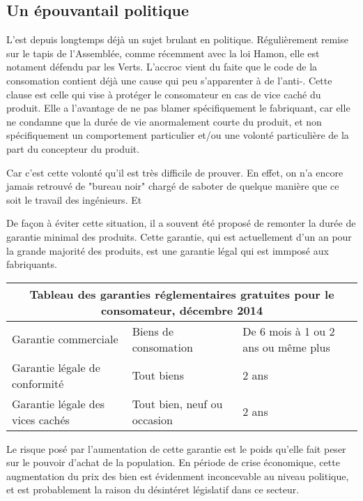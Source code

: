 \subsection{Un épouvantail politique}
L'\op est depuis longtemps déjà un sujet brulant en politique. Régulièrement remise sur le tapis de l'Assemblée, comme récemment avec la loi Hamon, elle est notament défendu par les Verts.
\smallbreak L'accroc vient du faite que le code de la consomation contient déjà une cause qui peu s'apparenter à de l'anti-\op.
Cette clause est celle qui vise à protéger le consomateur en cas de vice caché du produit. Elle a l'avantage de ne pas blamer spécifiquement le fabriquant, car elle ne condamne que la durée de vie anormalement courte du produit, et non spécifiquement un comportement particulier et/ou une volonté particulière de la part du concepteur du produit.

\smallbreak Car c'est cette volonté qu'il est très difficile de prouver. En effet, on n'a encore jamais retrouvé de "bureau noir" chargé de saboter de quelque manière que ce soit le travail des ingénieurs. Et

\smallbreak De façon à éviter cette situation, il a souvent été proposé de remonter la durée de garantie minimal des produits. Cette garantie, qui est actuellement d'un an pour la grande majorité des produits, est une garantie légal qui est immposé aux fabriquants.

\begin{center}
\begin{tabular}{|l|l|l|}
  \hline
  \multicolumn{3}{|c|}{Tableau des garanties réglementaires gratuites pour le consomateur, décembre 2014} \\
	\hline Garantie commerciale & Biens de consomation & De 6 mois à 1 ou 2 ans ou même plus\\
	       Garantie légale de conformité & Tout biens & 2 ans \\
	       Garantie légale des vices cachés & Tout bien, neuf ou occasion & 2 ans \\
	\hline
\end{tabular}
\end{center}


\smallbreak Le risque posé par l'aumentation de cette garantie est le poids qu'elle fait peser sur le pouvoir d'achat de la population.
En période de crise économique, cette augmentation du prix des bien est évidenment inconcevable au niveau politique, et est probablement la raison du désintéret législatif dans ce secteur.
